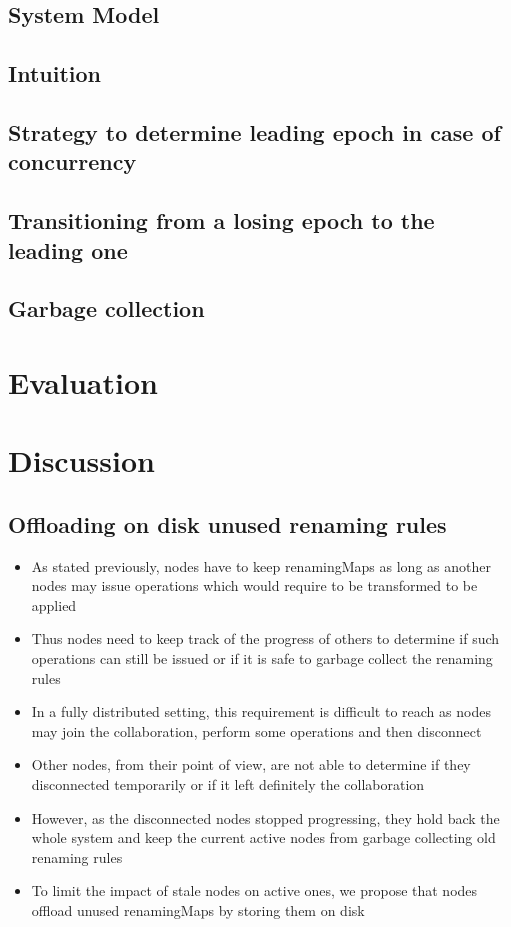 \documentclass{article}
\theoremstyle{definition}
\begin{document}
\subsection{System Model}
\subsection{Intuition}
\subsection{Strategy to determine leading epoch in case of concurrency}
\subsection{Transitioning from a losing epoch to the leading one}
\subsection{Garbage collection}

\section{Evaluation}

\section{Discussion}

\subsection{Offloading on disk unused renaming rules}

\begin{itemize}
    \item As stated previously, nodes have to keep renamingMaps as long as another nodes may issue operations which would require to be transformed to be applied
    \item Thus nodes need to keep track of the progress of others to determine if such operations can still be issued or if it is safe to garbage collect the renaming rules
    \item In a fully distributed setting, this requirement is difficult to reach as nodes may join the collaboration, perform some operations and then disconnect
    \item Other nodes, from their point of view, are not able to determine if they disconnected temporarily or if it left definitely the collaboration
    \item However, as the disconnected nodes stopped progressing, they hold back the whole system and keep the current active nodes from garbage collecting old renaming rules
    \item To limit the impact of stale nodes on active ones, we propose that nodes offload unused renamingMaps by storing them on disk
\end{itemize}
\end{document}
